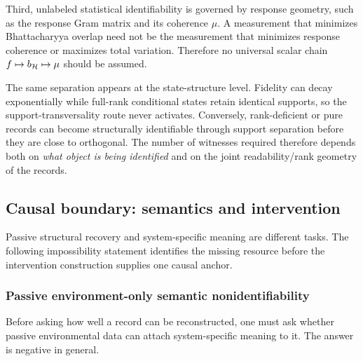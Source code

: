 Third, unlabeled statistical identifiability is governed by response geometry, such as the response Gram matrix and its coherence $\mu$.  A measurement that minimizes Bhattacharyya overlap need not be the measurement that minimizes response coherence or maximizes total variation.  Therefore no universal scalar chain $f\mapsto b_{\mathcal H}\mapsto\mu$ should be assumed.

The same separation appears at the state-structure level.  Fidelity can decay exponentially while full-rank conditional states retain identical supports, so the support-transversality route never activates.  Conversely, rank-deficient or pure records can become structurally identifiable through support separation before they are close to orthogonal.  The number of witnesses required therefore depends both on \emph{what object is being identified} and on the joint readability/rank geometry of the records.

\subsection{Causal boundary: semantics and intervention}
\label{sec:causal}

Passive structural recovery and system-specific meaning are different tasks.  The following impossibility statement identifies the missing resource before the intervention construction supplies one causal anchor.


\subsubsection{Passive environment-only semantic nonidentifiability}
\label{sec:semantic-nogo}

Before asking how well a record can be reconstructed, one must ask whether passive environmental data can attach system-specific meaning to it.  The answer is negative in general.

